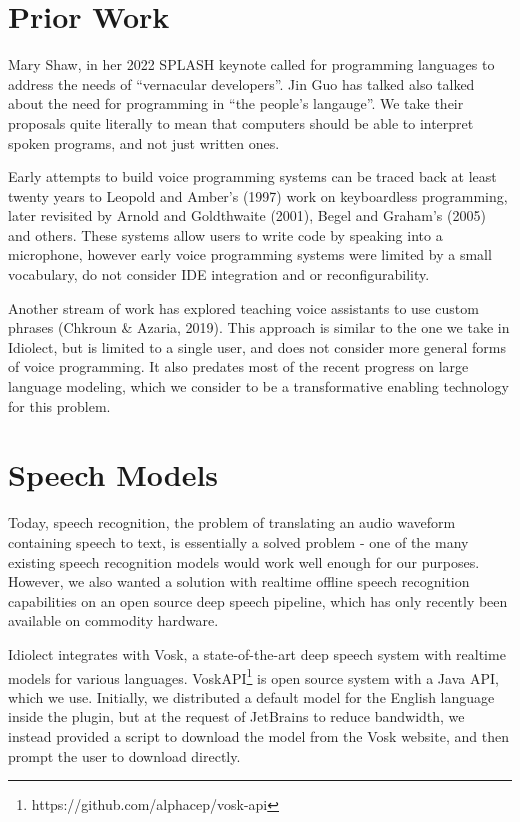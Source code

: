 \documentclass[conference]{IEEEtran}
\begin{document}
\section{Prior Work}

Mary Shaw, in her 2022 SPLASH keynote called for programming languages to address the needs of ``vernacular developers''. Jin Guo has talked also talked about the need for programming in ``the people's langauge''. We take their proposals quite literally to mean that computers should be able to interpret spoken programs, and not just written ones.

Early attempts to build voice programming systems can be traced back at least twenty years to Leopold and Amber's (1997) work on keyboardless programming, later revisited by Arnold and Goldthwaite (2001), Begel and Graham's (2005) and others. These systems allow users to write code by speaking into a microphone, however early voice programming systems were limited by a small vocabulary, do not consider IDE integration and or reconfigurability.

Another stream of work has explored teaching voice assistants to use custom phrases (Chkroun \& Azaria, 2019). This approach is similar to the one we take in Idiolect, but is limited to a single user, and does not consider more general forms of voice programming. It also predates most of the recent progress on large language modeling, which we consider to be a transformative enabling technology for this problem.

\section{Speech Models}

Today, speech recognition, the problem of translating an audio waveform containing speech to text, is essentially a solved problem - one of the many existing speech recognition models would work well enough for our purposes. However, we also wanted a solution with realtime offline speech recognition capabilities on an open source deep speech pipeline, which has only recently been available on commodity hardware.

Idiolect integrates with Vosk, a state-of-the-art deep speech system with realtime models for various languages. VoskAPI\footnote{https://github.com/alphacep/vosk-api} is open source system with a Java API, which we use. Initially, we distributed a default model for the English language inside the plugin, but at the request of JetBrains to reduce bandwidth, we instead provided a script to download the model from the Vosk website, and then prompt the user to download directly.
\end{document}
